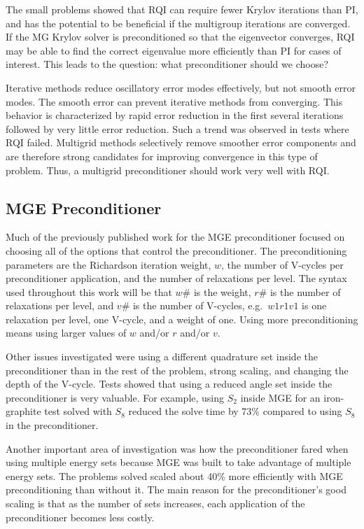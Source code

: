 \documentclass{article}                                                                           %
\begin{document}
The small problems showed that RQI can require fewer Krylov iterations than PI, and has the potential to be beneficial if the multigroup iterations are converged. If the MG Krylov solver is preconditioned so that the eigenvector converges, RQI may be able to find the correct eigenvalue more efficiently than PI for cases of interest. This leads to the question: what preconditioner should we choose?

Iterative methods reduce oscillatory error modes effectively, but not smooth error modes. The smooth error can prevent iterative methods from converging. This behavior is characterized by rapid error reduction in the first several iterations followed by very little error reduction. Such a trend was observed in tests where RQI failed. Multigrid methods selectively remove smoother error components and are therefore strong candidates for improving convergence in this type of problem. Thus, a multigrid preconditioner should work very well with RQI. 

\subsection{MGE Preconditioner}
Much of the previously published work for the MGE preconditioner focused on choosing all of the options that control the preconditioner. The preconditioning parameters are the Richardson iteration weight, $w$, the number of V-cycles per preconditioner application, and the number of relaxations per level. The syntax used throughout this work will be that $w\#$ is the weight, $r\#$ is the number of relaxations per level, and $v\#$ is the number of V-cycles, e.g.\ $w1r1v1$ is one relaxation per level, one V-cycle, and a weight of one. Using more preconditioning means using larger values of $w$ and/or $r$ and/or $v$. 

Other issues investigated were using a different quadrature set inside the preconditioner than in the rest of the problem, strong scaling, and changing the depth of the V-cycle. 
Tests showed that using a reduced angle set inside the preconditioner is very valuable. For example, using $S_2$ inside MGE for an iron-graphite test solved with $S_8$ reduced the solve time by 73\% compared to using $S_8$ in the preconditioner.

Another important area of investigation was how the preconditioner fared when using multiple energy sets because MGE was built to take advantage of multiple energy sets. The problems solved scaled about 40\% more efficiently with MGE preconditioning than without it. The main reason for the preconditioner's good scaling is that as the number of sets increases, each application of the preconditioner becomes less costly. 
\end{document}
